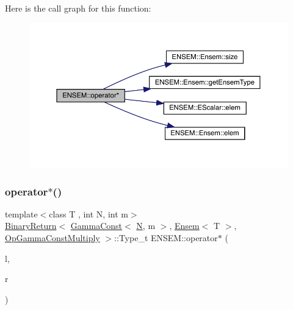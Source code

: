 Here is the call graph for this function\+:\nopagebreak
\begin{figure}[H]
\begin{center}
\leavevmode
\includegraphics[width=350pt]{d1/d9e/group__eensem_ga56ee052eb9134728080172ffe2e946af_cgraph}
\end{center}
\end{figure}
\mbox{\label{group__eensem_gab92286e5b611f00cb8f733f9d41d06a4}} 
\subsubsection{\texorpdfstring{operator$\ast$()}{operator*()}\hspace{0.1cm}{\footnotesize\ttfamily [4/11]}}
{\footnotesize\ttfamily template$<$class T , int N, int m$>$ \\
\mbox{\hyperlink{structENSEM_1_1BinaryReturn}{Binary\+Return}}$<$ \mbox{\hyperlink{classENSEM_1_1GammaConst}{Gamma\+Const}}$<$ \mbox{\hyperlink{adat__devel_2lib_2hadron_2operator__name__util_8cc_a7722c8ecbb62d99aee7ce68b1752f337}{N}}, m $>$, \mbox{\hyperlink{classENSEM_1_1Ensem}{Ensem}}$<$ T $>$, \mbox{\hyperlink{structENSEM_1_1OpGammaConstMultiply}{Op\+Gamma\+Const\+Multiply}} $>$\+::Type\+\_\+t E\+N\+S\+E\+M\+::operator$\ast$ (\begin{DoxyParamCaption}\item[{const \mbox{\hyperlink{classENSEM_1_1GammaConst}{Gamma\+Const}}$<$ \mbox{\hyperlink{adat__devel_2lib_2hadron_2operator__name__util_8cc_a7722c8ecbb62d99aee7ce68b1752f337}{N}}, m $>$ \&}]{l,  }\item[{const \mbox{\hyperlink{classENSEM_1_1Ensem}{Ensem}}$<$ T $>$ \&}]{r }\end{DoxyParamCaption})\hspace{0.3cm}{\ttfamily [inline]}}



